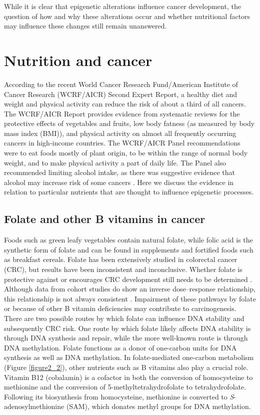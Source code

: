 \noindent While it is clear that epigenetic alterations influence cancer development, the question of how and why these alterations occur and whether nutritional factors may influence these changes still remain unanswered.
\section[]{Nutrition and cancer} %
\noindent According to the recent World Cancer Research Fund/American Institute of Cancer Research (WCRF/AICR) Second Expert Report, a healthy diet and weight and physical activity can reduce the risk of about a third of all cancers. The WCRF/AICR Report provides evidence from systematic reviews for the protective effects of vegetables and fruits, low body fatness (as measured by body mass index (BMI)), and physical activity on almost all frequently occurring cancers in high-income countries. The WCRF/AICR Panel recommendations were to eat foods mostly of plant origin, to be within the range of normal body weight, and to make physical activity a part of daily life. The Panel also recommended limiting alcohol intake, as there was suggestive evidence that alcohol may increase risk of some cancers \cite{c214}. Here we discuss the evidence in relation to particular nutrients that are thought to influence epigenetic processes.

\subsection{Folate and other B vitamins in cancer} %
\noindent Foods such as green leafy vegetables contain natural folate, while folic acid is the synthetic form of folate and can be found in supplements and fortified foods such as breakfast cereals. Folate has been extensively studied in colorectal cancer (CRC), but results have been inconsistent and inconclusive. Whether folate is protective against or encourages CRC development still needs to be determined \cite{c227}. Although data from cohort studies do show an inverse dose--response relationship, this relationship is not always consistent \cite{c214}. Impairment of these pathways by folate or because of other B vitamin deficiencies may contribute to carcinogenesis. There are two possible routes by which folate can influence DNA stability and subsequently CRC risk. One route by which folate likely affects DNA stability is through DNA synthesis and repair, while the more well-known route is through DNA methylation. Folate functions as a donor of one-carbon units for DNA synthesis as well as DNA methylation. In folate-mediated one-carbon metabolism (Figure \ref{figure2_2}), other nutrients such as B vitamins also play a crucial role. Vitamin B12 (cobalamin) is a cofactor in both the conversion of homocysteine to methionine and the conversion of 5-methyltetrahydrofolate to tetrahydrofolate. Following its biosynthesis from homocysteine, methionine is converted to \emph{S}-adenosylmethionine (SAM), which donates methyl groups for DNA methylation.


